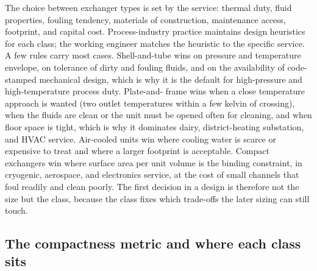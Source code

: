 The choice between exchanger types is set by the service: thermal
duty, fluid properties, fouling tendency, materials of construction,
maintenance access, footprint, and capital cost. Process-industry
practice maintains design heuristics for each class; the working
engineer matches the heuristic to the specific service. A few rules
carry most cases. Shell-and-tube wins on pressure and temperature
envelope, on tolerance of dirty and fouling fluids, and on the
availability of code-stamped mechanical design, which is why it is the
default for high-pressure and high-temperature process duty. Plate-and-
frame wins when a close temperature approach is wanted (two outlet
temperatures within a few kelvin of crossing), when the fluids are clean
or the unit must be opened often for cleaning, and when floor space is
tight, which is why it dominates dairy, district-heating substation, and
HVAC service. Air-cooled units win where cooling water is scarce or
expensive to treat and where a larger footprint is acceptable. Compact
exchangers win where surface area per unit volume is the binding
constraint, in cryogenic, aerospace, and electronics service, at the cost
of small channels that foul readily and clean poorly. The first decision
in a design is therefore not the size but the class, because the class
fixes which trade-offs the later sizing can still touch.

\subsection{The compactness metric and where each class sits}

